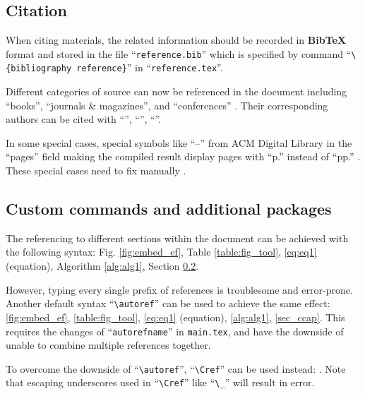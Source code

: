 \subsection{Citation}

When citing materials, the related information should be recorded in \textbf{BibTeX} format and stored in the file \enquote{\texttt{reference.bib}} which is specified by command \enquote{\texttt{\textbackslash\{bibliography reference\}}} in \enquote{\texttt{reference.tex}}.

Different categories of source can now be referenced in the document including \enquote{books}, \enquote{journals \& magazines}, and \enquote{conferences} \cite{10614682,10556316,9845195}. Their corresponding authors can be cited with \enquote{\citeauthor{10614682}}, \enquote{\citeauthor{10556316}}, \enquote{\citeauthor{9845195}}.

In some special cases, special symbols like \enquote{–} from ACM Digital Library in the \enquote{pages} field making the compiled result display pages with \enquote{p.} instead of \enquote{pp.} \cite{10.1145/3634737.3665024}. These special cases need to fix manually \cite{10.1145/3634737.3665024mod}.

\subsection{Custom commands and additional packages}
\label{sec_ccap}

The referencing to different sections within the document can be achieved with the following syntax: Fig. \ref{fig:embed_ef}, Table \ref{table:fig_tool}, \ref{eq:eq1} (equation), Algorithm \ref{alg:alg1}, Section \ref{sec_ccap}.

However, typing every single prefix of references is troublesome and error-prone. Another default syntax \enquote{\texttt{\textbackslash autoref}} can be used to achieve the same effect: \autoref{fig:embed_ef}, \autoref{table:fig_tool}, \autoref{eq:eq1} (equation), \autoref{alg:alg1}, \autoref{sec_ccap}. This requires the changes of \enquote{\texttt{autorefname}} in \texttt{main.tex}, and have the downside of unable to combine multiple references together.

To overcome the downside of \enquote{\texttt{\textbackslash autoref}}, \enquote{\texttt{\textbackslash Cref}} can be used instead: . Note that escaping underscores used in \enquote{\texttt{\textbackslash Cref}} like \enquote{\texttt{\textbackslash\_}} will result in error.

